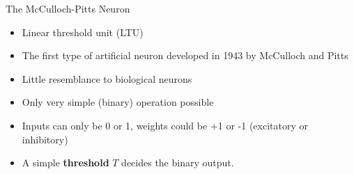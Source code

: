 \documentclass[9pt, aspectratio=169]{beamer}
\begin{document}
\begin{frame}
    {The McCulloch-Pitts Neuron}

    \begin{itemize}
        \item Linear threshold unit (LTU)
        \item The first type of artificial neuron developed in 1943 by McCulloch and Pitts
        \item Little resemblance to biological neurons
        \item Only very simple (binary) operation possible
        \item Inputs can only be 0 or 1, weights could be +1 or -1 (excitatory or inhibitory)
        \item A simple \textbf{threshold} $T$ decides the binary output.
    \end{itemize}

    \centering
\end{frame}
\end{document}
